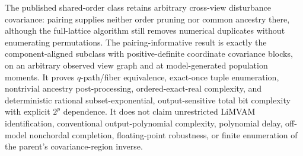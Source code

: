The published shared-order class retains arbitrary cross-view disturbance covariance: pairing supplies neither order pruning nor common ancestry there, although the full-lattice algorithm still removes numerical duplicates without enumerating permutations. The pairing-informative result is exactly the component-aligned subclass with positive-definite coordinate covariance blocks, on an arbitrary observed view graph and at model-generated population moments. It proves \(q\)-path/fiber equivalence, exact-once tuple enumeration, nontrivial ancestry post-processing, ordered-exact-real complexity, and deterministic rational subset-exponential, output-sensitive total bit complexity with explicit \(2^p\) dependence. It does not claim unrestricted LiMVAM identification, conventional output-polynomial complexity, polynomial delay, off-model nonchordal completion, floating-point robustness, or finite enumeration of the parent's covariance-region inverse.

